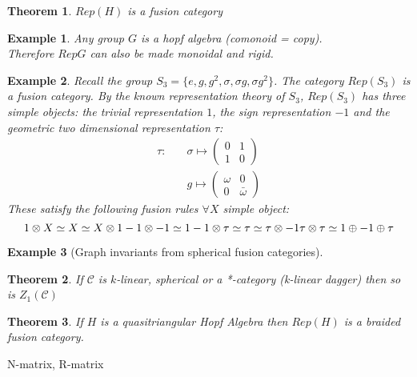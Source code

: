 \documentclass{article}
\newtheorem{example}{Example}
\newtheorem{theorem}{Theorem}
\begin{document}
	\begin{theorem}
		$Rep(H)$ is a fusion category
	\end{theorem}
	
	\begin{example}
		Any group $G$ is a hopf algebra (comonoid = copy).\\
		Therefore $RepG$ can also be made monoidal and rigid.
	\end{example}
	
	\begin{example}
		Recall the group $S_3=\{e, g, g^2, \sigma, \sigma g, \sigma g^2 \}$. The category $Rep(S_3)$ is a fusion category. By the known representation theory of $S_3$, $Rep(S_3)$ has three simple objects: the trivial representation $1$, the sign representation $-1$ and the geometric two dimensional representation $\tau$:
		\begin{equation*}
		\begin{split}
		\tau : \quad & \sigma \mapsto \left( {\begin{array}{cc} 0 & 1 \\ 1 & 0 \end{array}}\right) \\
		& g \mapsto \left( {\begin{array}{cc} \omega & 0 \\ 0 & \bar{\omega} \end{array}}\right)
		\end{split}
		\end{equation*}
		These satisfy the following fusion rules $\forall X$ simple object:
		\begin{equation}
		1 \otimes X \simeq X \simeq X \otimes 1\\
		-1 \otimes -1 \simeq 1\\
		-1 \otimes \tau \simeq \tau \simeq \tau \otimes -1\\
		\tau \otimes \tau \simeq 1 \oplus -1 \oplus \tau\\
		\end{equation}		
	\end{example}
	
	\begin{example}[Graph invariants from spherical fusion categories]
	\end{example}

	\begin{theorem}
		If $\mathcal{C}$ is $k$-linear, spherical or a *-category (k-linear dagger) then so is $Z_1(\mathcal{C})$ 
	\end{theorem}

	\begin{theorem}
		If $H$ is a quasitriangular Hopf Algebra then $Rep(H)$ is a braided fusion category.
	\end{theorem}
	
	N-matrix, R-matrix
\end{document}
